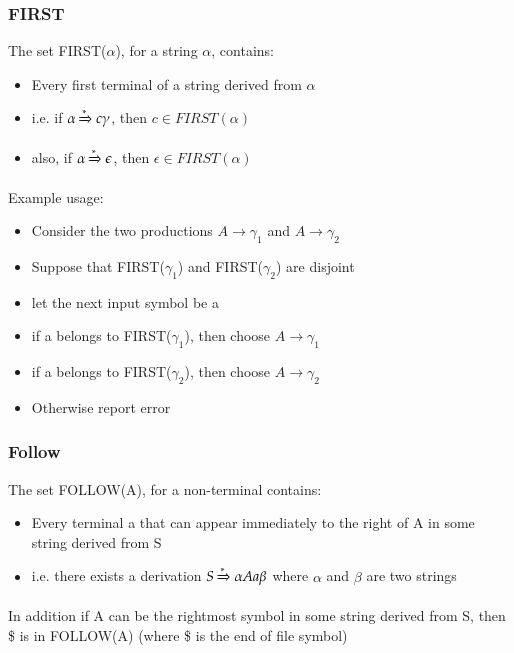 \documentclass{article}[18pt]
\begin{document}
\subsubsection{FIRST}
The set FIRST($\alpha$), for a string $\alpha$, contains:
\begin{itemize}
	\item Every first terminal of a string derived from $\alpha$
	\item i.e. if $\alpha\xRightarrow{*} c\gamma$, then $c\in FIRST(\alpha)$
	\item also, if $\alpha\xRightarrow{*} \epsilon$, then $\epsilon\in FIRST(\alpha)$
\end{itemize}
Example usage:
\begin{itemize}
	\item Consider the two productions $A\rightarrow \gamma_1$ and $A\rightarrow \gamma_2$
	\item Suppose that FIRST($\gamma_1$) and FIRST($\gamma_2$) are disjoint
	\item let the next input symbol be a
	\item if a belongs to FIRST($\gamma_1$), then choose $A\rightarrow \gamma_1$
	\item if a belongs to FIRST($\gamma_2$), then choose $A\rightarrow \gamma_2$
	\item Otherwise report error
\end{itemize}
\subsubsection{Follow}
The set FOLLOW(A), for a non-terminal contains:
\begin{itemize}
	\item Every terminal a that can appear immediately to the right of A in some string derived from S
	\item i.e. there exists a derivation $S\xRightarrow{*}\alpha Aa\beta$ where $\alpha$ and $\beta$ are two strings
\end{itemize}
In addition if A can be the rightmost symbol in some string derived from S, then \$ is in FOLLOW(A) (where \$ is the end of file symbol)
\end{document}
